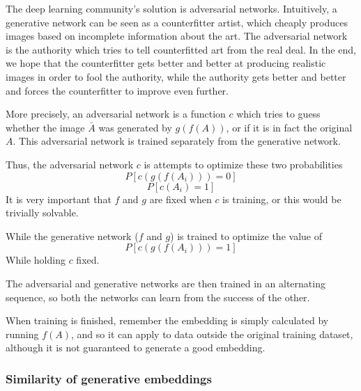 \documentclass{article}
\begin{document}
	The deep learning community's solution is adversarial networks. %
	Intuitively, a generative network can be seen as a counterfitter artist, which cheaply produces images based on incomplete information about the art. The adversarial network is the authority which tries to tell counterfitted art from the real deal. In the end, we hope that the counterfitter gets better and better at producing realistic images in order to fool the authority, while the authority gets better and better and forces the counterfitter to improve even further.  
	
	More precisely, an adversarial network is a function $c$ which tries to guess whether the image $\bar{A}$ was generated by $g(f(A))$, or if it is in fact the original $A$. This adversarial network is trained separately from the generative network. 
	
	Thus, the adversarial network $c$ is attempts to optimize these two probabilities
	$$P[c(g(f(A_i))) = 0]$$
	$$P[c(A_i) = 1]$$
	It is very important that $f$ and $g$ are fixed when $c$ is training, or this would be trivially solvable. 
	
	While the generative network ($f$ and $g$) is trained to optimize the value of 
	$$P[c(g(f(A_i))) = 1]$$
	While holding $c$ fixed. 
	
	The adversarial and generative networks are then trained in an alternating sequence, so both the networks can learn from the success of the other. 
	
	
	When training is finished, remember the embedding is simply calculated by running $f(A)$, and so it can apply to data outside the original training dataset, although it is not guaranteed to generate a good embedding. 
	
	
	
	\subsubsection{Similarity of generative embeddings}
	
\end{document}
